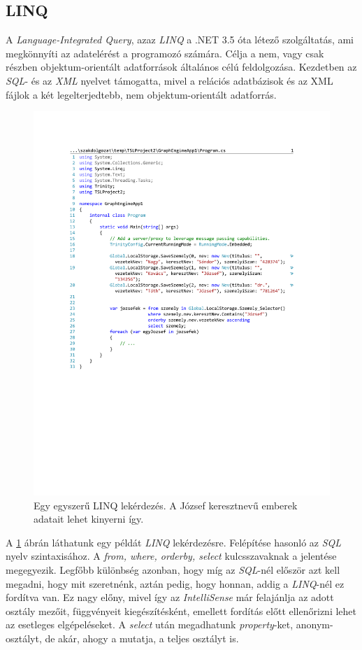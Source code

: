 \subsection{LINQ} \label{graphenginelinq}

A \emph{Language-Integrated Query}, azaz \emph{LINQ} a .NET 3.5 óta létező szolgáltatás, ami megkönnyíti az adatelérést a programozó számára. Célja a nem, vagy csak részben objektum-orientált adatforrások általános célú feldolgozása. Kezdetben az \emph{SQL}- és az \emph{XML} nyelvet támogatta, mivel a relációs adatbázisok és az XML fájlok a két legelterjedtebb, nem objektum-orientált adatforrás.

\begin{figure}[H]
	\centering
	\includegraphics[]{figures/JozsefekLINQ.pdf}
	\caption{Egy egyszerű LINQ lekérdezés. A József keresztnevű emberek adatait lehet kinyerni így.}
	\label{fig:LINQ}
\end{figure}

A \ref{fig:LINQ} ábrán láthatunk egy példát \emph{LINQ} lekérdezésre. Felépítése hasonló az \emph{SQL} nyelv szintaxisához. A \emph{from, where, orderby, select} kulcsszavaknak a jelentése megegyezik. Legfőbb különbség azonban, hogy míg az \emph{SQL}-nél először azt kell megadni, hogy mit szeretnénk, aztán pedig, hogy honnan, addig a \emph{LINQ}-nél ez fordítva van. Ez nagy előny, mivel így az \emph{IntelliSense} már felajánlja az adott osztály mezőit, függvényeit kiegészítésként, emellett fordítás előtt ellenőrizni lehet az esetleges elgépeléseket. A \emph{select} után megadhatunk \emph{property}-ket, anonym-osztályt, de akár, ahogy a  mutatja, a teljes osztályt is.

